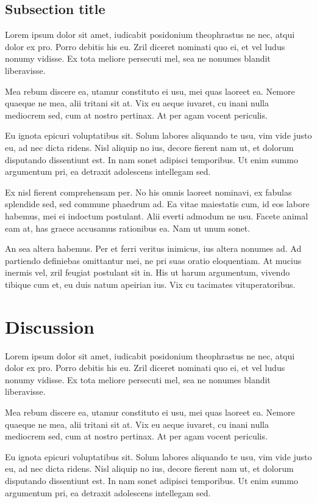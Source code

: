 \documentclass[10pt,onecolumn]{article}
\begin{document}
\subsection{Subsection title}
%
Lorem ipsum dolor sit amet, iudicabit posidonium theophrastus ne nec, atqui dolor ex pro. Porro debitis his eu. Zril diceret nominati quo ei, et vel ludus nonumy vidisse. Ex tota meliore persecuti mel, sea ne nonumes blandit liberavisse.

Mea rebum discere ea, utamur constituto ei usu, mei quas laoreet ea. Nemore quaeque ne mea, alii tritani sit at. Vix eu aeque iuvaret, cu inani nulla mediocrem sed, cum at nostro pertinax. At per agam vocent periculis.

Eu ignota epicuri voluptatibus sit. Solum labores aliquando te usu, vim vide justo eu, ad nec dicta ridens. Nisl aliquip no ius, decore fierent nam ut, et dolorum disputando dissentiunt est. In nam sonet adipisci temporibus. Ut enim summo argumentum pri, ea detraxit adolescens intellegam sed.

Ex nisl fierent comprehensam per. No his omnis laoreet nominavi, ex fabulas splendide sed, sed commune phaedrum ad. Ea vitae maiestatis cum, id eos labore habemus, mei ei indoctum postulant. Alii everti admodum ne usu. Facete animal eam at, has graece accusamus rationibus ea. Nam ut unum sonet.

An sea altera habemus. Per et ferri veritus inimicus, ius altera nonumes ad. Ad partiendo definiebas omittantur mei, ne pri suas oratio eloquentiam. At mucius inermis vel, zril feugiat postulant sit in. His ut harum argumentum, vivendo tibique cum et, eu duis natum apeirian ius. Vix cu tacimates vituperatoribus.
%
\section{Discussion}
%
Lorem ipsum dolor sit amet, iudicabit posidonium theophrastus ne nec, atqui dolor ex pro. Porro debitis his eu. Zril diceret nominati quo ei, et vel ludus nonumy vidisse. Ex tota meliore persecuti mel, sea ne nonumes blandit liberavisse.

Mea rebum discere ea, utamur constituto ei usu, mei quas laoreet ea. Nemore quaeque ne mea, alii tritani sit at. Vix eu aeque iuvaret, cu inani nulla mediocrem sed, cum at nostro pertinax. At per agam vocent periculis.

Eu ignota epicuri voluptatibus sit. Solum labores aliquando te usu, vim vide justo eu, ad nec dicta ridens. Nisl aliquip no ius, decore fierent nam ut, et dolorum disputando dissentiunt est. In nam sonet adipisci temporibus. Ut enim summo argumentum pri, ea detraxit adolescens intellegam sed.
\end{document}
